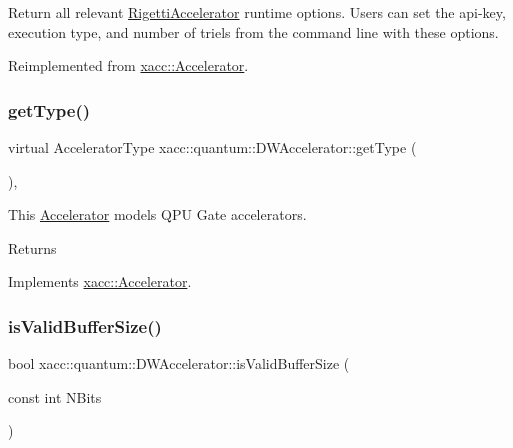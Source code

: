 Return all relevant \hyperlink{a01165}{Rigetti\+Accelerator} runtime options. Users can set the api-\/key, execution type, and number of triels from the command line with these options. 

Reimplemented from \hyperlink{a01613_a98c9eda6b54367c75667ecfbbf167979}{xacc\+::\+Accelerator}.

\mbox{\label{a01133_abe50e427b4bec0460cc238405cb569f9}} 
\subsubsection{\texorpdfstring{get\+Type()}{getType()}}
{\footnotesize\ttfamily virtual Accelerator\+Type xacc\+::quantum\+::\+D\+W\+Accelerator\+::get\+Type (\begin{DoxyParamCaption}{ }\end{DoxyParamCaption})\hspace{0.3cm}{\ttfamily [inline]}, {\ttfamily [virtual]}}

This \hyperlink{a01613}{Accelerator} models Q\+PU Gate accelerators. \begin{DoxyReturn}{Returns}

\end{DoxyReturn}


Implements \hyperlink{a01613_aaffc3e4bb9880eb5041b1b58ee4c2665}{xacc\+::\+Accelerator}.

\mbox{\label{a01133_a4c2ee30212a919d8ddf7f9555df25195}} 
\subsubsection{\texorpdfstring{is\+Valid\+Buffer\+Size()}{isValidBufferSize()}}
{\footnotesize\ttfamily bool xacc\+::quantum\+::\+D\+W\+Accelerator\+::is\+Valid\+Buffer\+Size (\begin{DoxyParamCaption}\item[{const int}]{N\+Bits }\end{DoxyParamCaption})\hspace{0.3cm}{\ttfamily [virtual]}}

